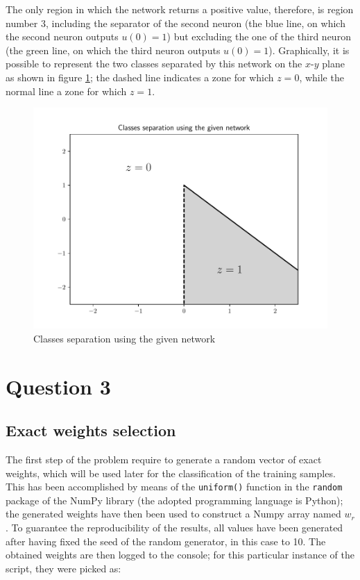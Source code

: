 \documentclass[letterpaper,headings=standardclasses]{scrartcl}
\begin{document}
The only region in which the network returns a positive value, therefore, is region number 3, including the separator of the second neuron (the blue line, on which the second neuron outputs $u(0) = 1$) but excluding the one of the third neuron (the green line, on which the third neuron outputs $u(0) = 1$). Graphically, it is possible to represent the two classes separated by this network on the $x$-$y$ plane as shown in figure \ref{net_sep}; the dashed line indicates a zone for which $z = 0$, while the normal line a zone for which $z = 1$.

\begin{figure}[h]
\centering
\includegraphics[width=0.7\linewidth]{net_sep.pdf}
\caption{Classes separation using the given network}
\label{net_sep}
\end{figure}

\section{Question 3}

\subsection{Exact weights selection}

The first step of the problem require to generate a random vector of exact weights, which will be used later for the classification of the training samples. This has been accomplished by means of the \texttt{uniform()} function in the \texttt{random} package of the NumPy library (the adopted programming language is Python); the generated weights have then been used to construct a Numpy array named $w_r$. To guarantee the reproducibility of the results, all values have been generated after having fixed the seed of the random generator, in this case to 10. The obtained weights are then logged to the console; for this particular instance of the script, they were picked as:
\end{document}
